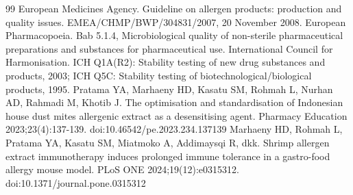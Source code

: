 \documentclass[11pt,a4paper]{article}
\begin{document}
\begin{thebibliography}{99}
\small
\setlength{\itemsep}{2pt}
 European Medicines Agency. Guideline on allergen products: production and quality issues. EMEA/CHMP/BWP/304831/2007, 20 November 2008.
 European Pharmacopoeia. Bab 5.1.4, Microbiological quality of non-sterile pharmaceutical preparations and substances for pharmaceutical use.
 International Council for Harmonisation. ICH Q1A(R2): Stability testing of new drug substances and products, 2003; ICH Q5C: Stability testing of biotechnological/biological products, 1995.
 Pratama YA, Marhaeny HD, Kasatu SM, Rohmah L, Nurhan AD, Rahmadi M, Khotib J. The optimisation and standardisation of Indonesian house dust mites allergenic extract as a desensitising agent. Pharmacy Education 2023;23(4):137-139. doi:10.46542/pe.2023.234.137139
 Marhaeny HD, Rohmah L, Pratama YA, Kasatu SM, Miatmoko A, Addimaysqi R, dkk. Shrimp allergen extract immunotherapy induces prolonged immune tolerance in a gastro-food allergy mouse model. PLoS ONE 2024;19(12):e0315312. doi:10.1371/journal.pone.0315312
\end{thebibliography}
\end{document}

